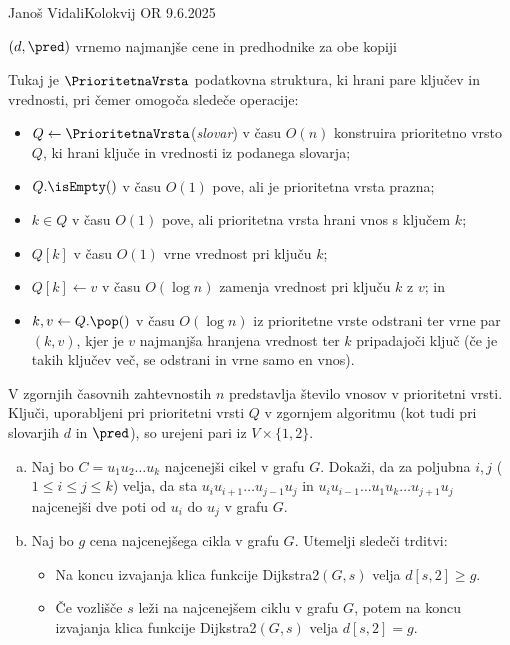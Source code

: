 \begin{naloga}{Janoš Vidali}{Kolokvij OR 9.6.2025}
\begin{vprasanje}
\begin{small}
\begin{algorithmic}
			\EndIf
		\EndFor
	\EndWhile
	\State \Return $(d, \pred)$
	\hfill vrnemo najmanjše cene in predhodnike za obe kopiji
\EndFunction
\end{algorithmic}
\end{small}
Tukaj je $\PrioritetnaVrsta$ podatkovna struktura,
ki hrani pare ključev in vred\-no\-sti,
pri čemer omogoča sledeče operacije:
\begin{itemize}
\itemsep 0mm
\item $Q \gets \PrioritetnaVrsta$({\sl slovar})
v času $O(n)$ konstruira prioritetno vrsto $Q$,
ki hrani ključe in vrednosti iz podanega slovarja;
\item $Q.\isEmpty()$ v času $O(1)$ pove, ali je prioritetna vrsta prazna;
\item $k \in Q$ v času $O(1)$ pove,
ali prioritetna vrsta hrani vnos s ključem $k$;
\item $Q[k]$ v času $O(1)$ vrne vrednost pri ključu $k$;
\item $Q[k] \gets v$ v času $O(\log n)$ zamenja vrednost pri ključu $k$ z $v$;
in
\item $k, v \gets Q.\pop()$ v času $O(\log n)$
iz prioritetne vrste odstrani ter vrne par $(k, v)$,
kjer je $v$ najmanjša hranjena vrednost ter $k$ pripadajoči ključ
(če je takih ključev več, se odstrani in vrne samo en vnos).
\end{itemize}
V zgornjih časovnih zahtevnostih $n$ predstavlja
število vnosov v prioritetni vrsti.
Ključi, uporabljeni pri prioritetni vrsti $Q$ v zgornjem algoritmu
(kot tudi pri slovarjih $d$ in $\pred$),
so urejeni pari iz $V \times \{1, 2\}$.

\begin{enumerate}[(a)]
\item Naj bo $C = u_1 u_2 \dots u_k$ najcenejši cikel v grafu $G$.
Dokaži, da za poljubna $i, j$ ($1 \le i \le j \le k$) velja,
da sta $u_i u_{i+1} \dots u_{j-1} u_j$
in $u_i u_{i-1} \dots u_1 u_k \dots u_{j+1} u_j$
najcenejši dve poti od $u_i$ do $u_j$ v grafu $G$.

\item Naj bo $g$ cena najcenejšega cikla v grafu $G$.
Utemelji sledeči trditvi:
\begin{itemize}
\itemsep 0mm
\item Na koncu izvajanja klica funkcije {\sc Dijkstra2}$(G, s)$
velja $d[s, 2] \ge g$.
\item Če vozlišče $s$ leži na najcenejšem ciklu v grafu $G$,
potem na koncu izvajanja klica funkcije {\sc Dijkstra2}$(G, s)$
velja $d[s, 2] = g$.
\end{itemize}


\end{enumerate}
\end{vprasanje}
\end{naloga}
